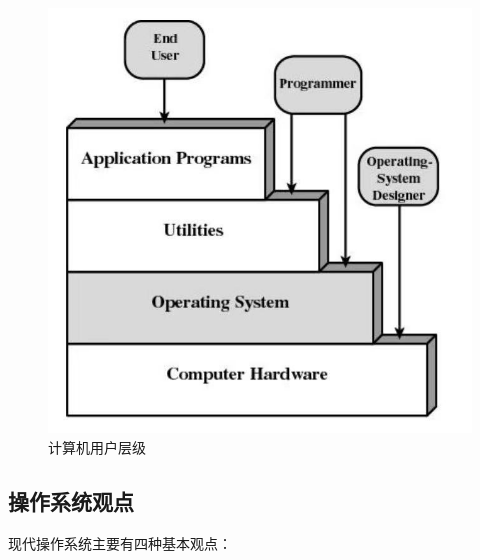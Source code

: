 \begin{figure}[H]
	\centering
	\includegraphics[scale=0.8]{img/C1/1-1/2.png}
	\caption{计算机用户层级}
\end{figure}

\subsection{操作系统观点}

现代操作系统主要有四种基本观点：

